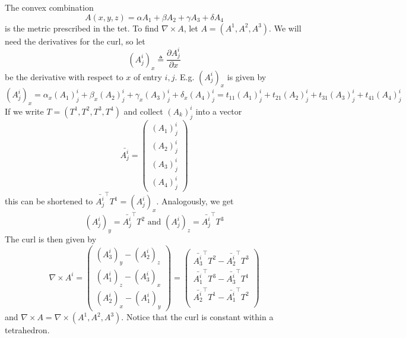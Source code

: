 \documentclass[../thesis.tex]{subfiles}
\begin{document}
The convex combination
$$A(x,y,z) = \alpha A_1 + \beta A_2 + \gamma A_3 + \delta A_4$$
is the metric prescribed in the tet. To find $\nabla \times A$, let
$A = (A^1, A^2, A^3)$. We will need the derivatives for the curl, so let
$$(A^i_j)_x \triangleq \frac{\partial A^i_j}{\partial x}$$ be the derivative with respect to $x$ of entry $i,j$.
E.g. $(A^i_j)_x$ is given by
$$(A^i_j)_x = \alpha_x (A_1)^i_j + \beta_x (A_2)^i_j + \gamma_x (A_3)^i_j + \delta_x (A_4)^i_j = t_{11}(A_1)^i_j + t_{21}(A_2)^i_j + t_{31}(A_3)^i_j + t_{41}(A_4)^i_j$$
If we write $T= (T^1, T^2, T^3, T^4)$ and collect $(A_k)^i_j$ into a vector
$$\bar{A^i_j}=\begin{pmatrix}
  (A_1)^i_j \\ (A_2)^i_j \\ (A_3)^i_j \\ (A_4)^i_j
\end{pmatrix}$$
this can be shortened to $\bar{A^i_j}^{\top}T^1 = (A^i_j)_x$.
Analogously, we get
$$(A^i_j)_y = \bar{A^i_j}^{\top}T^2  \text{ and } (A^i_j)_z = \bar{A^i_j}^{\top}T^3$$
The curl is then given by
$$\nabla \times A^i = \begin{pmatrix}
  (A^i_3)_y - (A^i_2)_z \\
  (A^i_1)_z - (A^i_3)_x \\
  (A^i_2)_x - (A^i_1)_y
\end{pmatrix} =
\begin{pmatrix}
  \bar{A^i_3}^{\top}T^2 - \bar{A^i_2}^{\top}T^3\\
  \bar{A^i_1}^{\top}T^3 - \bar{A^i_3}^{\top}T^1\\
  \bar{A^i_2}^{\top}T^1 - \bar{A^i_1}^{\top}T^2\\
\end{pmatrix}$$
and $\nabla \times A = \nabla \times (A^1, A^2, A^3)$.
Notice that the curl is constant within a tetrahedron.
\end{document}
